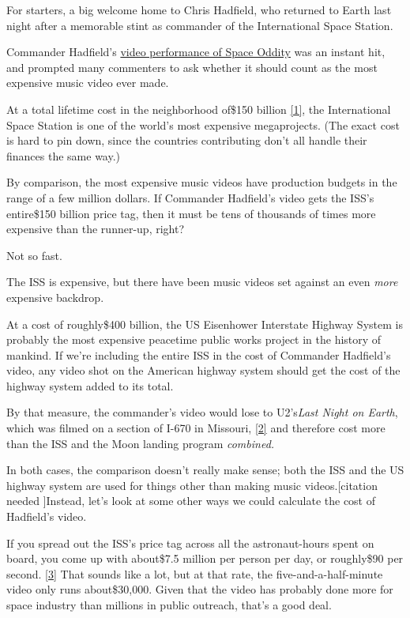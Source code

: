 {\hfill{}

{For starters, a big welcome home to Chris Hadfield, who returned to Earth last night after a memorable stint as commander of the International Space Station.}

{Commander Hadfield’s \href{http://www.youtube.com/watch?v=KaOC9danxNo}{video performance of Space Oddity} was an instant hit, and prompted many commenters to ask whether it should count as the most expensive music video ever made.}

{At a total lifetime cost in the neighborhood of\$150 billion \href{http://www.thespacereview.com/article/1579/1}{[1]}, the International Space Station is one of the world’s most expensive megaprojects. (The exact cost is hard to pin down, since the countries contributing don’t all handle their finances the same way.)}

{By comparison, the most expensive music videos have production budgets in the range of a few million dollars. If Commander Hadfield’s video gets the ISS’s entire\$150 billion price tag, then it must be tens of thousands of times more expensive than the runner-up, right?}

{Not so fast.}

{The ISS is expensive, but there have been music videos set against an even \emph{more} expensive backdrop.}

{At a cost of roughly\$400 billion, the US Eisenhower Interstate Highway System is probably the most expensive peacetime public works project in the history of mankind. If we’re including the entire ISS in the cost of Commander Hadfield’s video, any video shot on the American highway system should get the cost of the highway system added to its total.}

{By that measure, the commander’s video would lose to U2’s\emph{Last Night on Earth}, which was filmed on a section of I-670 in Missouri, \href{http://www.atu2.com/news/filming-of-music-video-will-shut-down-i-670-downtown-for-several-hours-tuesday.html}{[2]} and therefore cost more than the ISS and the Moon landing program \emph{combined.} }

{In both cases, the comparison doesn’t really make sense; both the ISS and the US highway system are used for things other than making music videos.[{citation needed} ]Instead, let’s look at some other ways we could calculate the cost of Hadfield’s video.}

{If you spread out the ISS’s price tag across all the astronaut-hours spent on board, you come up with about\$7.5 million per person per day, or roughly\$90 per second. \href{http://www.thespacereview.com/article/1579/1}{[3]} That sounds like a lot, but at that rate, the five-and-a-half-minute video only runs about\$30,000. Given that the video has probably done more for space industry than millions in public outreach, that’s a good deal.}

}
